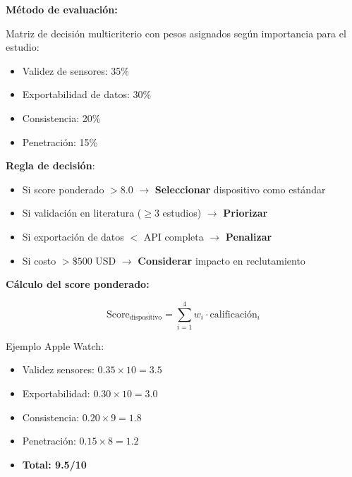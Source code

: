 \documentclass[12pt,letterpaper,twoside]{report}
\begin{document}
\begin{estadisticobox}
\textbf{Método de evaluación:}

Matriz de decisión multicriterio con pesos asignados según importancia para el estudio:
\begin{itemize}[noitemsep]
    \item Validez de sensores: 35\%
    \item Exportabilidad de datos: 30\%
    \item Consistencia: 20\%
    \item Penetración: 15\%
\end{itemize}
\end{estadisticobox}

\begin{reglabox}
\textbf{Regla de decisión}:

\begin{itemize}[noitemsep]
    \item Si score ponderado $> 8.0$ $\to$ \textbf{Seleccionar} dispositivo como estándar
    \item Si validación en literatura ($\geq 3$ estudios) $\to$ \textbf{Priorizar}
    \item Si exportación de datos $<$ API completa $\to$ \textbf{Penalizar}
    \item Si costo $> \$500$ USD $\to$ \textbf{Considerar} impacto en reclutamiento
\end{itemize}
\end{reglabox}

\begin{calculobox}
\textbf{Cálculo del score ponderado:}

\begin{equation}
\text{Score}_{\text{dispositivo}} = \sum_{i=1}^{4} w_i \cdot \text{calificación}_i
\end{equation}

Ejemplo Apple Watch:
\begin{itemize}[noitemsep]
    \item Validez sensores: $0.35 \times 10 = 3.5$
    \item Exportabilidad: $0.30 \times 10 = 3.0$
    \item Consistencia: $0.20 \times 9 = 1.8$
    \item Penetración: $0.15 \times 8 = 1.2$
    \item \textbf{Total: 9.5/10}
\end{itemize}
\end{calculobox}
\end{document}

